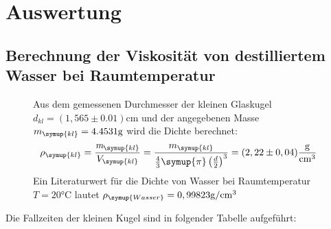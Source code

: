 \section{Auswertung}
\label{sec:Auswertung}


\subsection{Berechnung der Viskosität von destilliertem Wasser bei Raumtemperatur}
\label{sec:Berechnung der Viskosität von destilliertem Wasser bei Raumtemperatur}
\begin{figure} [H]
  Aus dem gemessenen Durchmesser der kleinen Glaskugel $d_{kl}=(1,565\pm0.01) \unit{\centi\metre}$ und der angegebenen Masse
  $m_{\symup{kl}}=4.4531\unit{\gram}$ wird die Dichte berechnet:
  \begin{equation}
    \rho_{\symup{kl}}=\frac{\emph{m}_{\symup{kl}}}{V_{\symup{kl}}}=%
    \frac{m_{\symup{kl}}}{\frac{4}{3}\symup{\pi}\left(\frac{d}{2}\right)^3}=(2,22\pm0,04) \unit{\gram\per\cubic\centi\metre}
  \end{equation}
  Ein Literaturwert für die Dichte von Wasser bei Raumtemperatur $T=20 \unit{\celsius}$ lautet
  $\rho_{\symup{Wasser}}=0,99823 \unit{\gram\per\cubic\centi\metre}$\cite[551/C23]{czichos}
  
\end{figure}

Die Fallzeiten der kleinen Kugel sind in folgender Tabelle aufgeführt:

